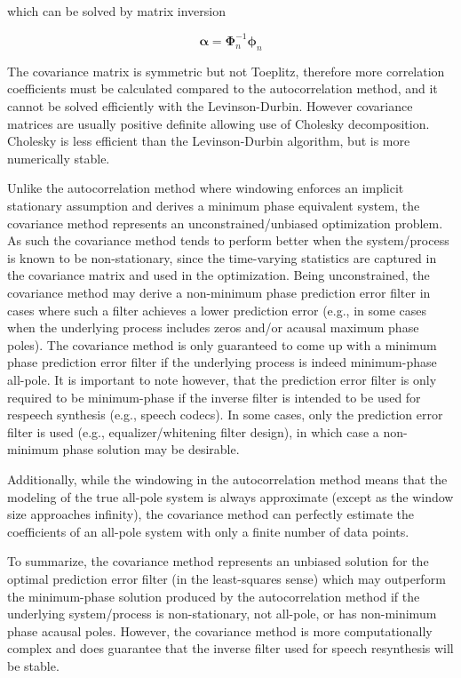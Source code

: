 \noindent
which can be solved by matrix inversion
 
 \begin{equation}
 	\boldsymbol{\alpha} = \boldsymbol{\Phi}_n^{-1} \boldsymbol{\phi}_n
 \end{equation}
 
The covariance matrix is symmetric but not Toeplitz, therefore more correlation coefficients must be calculated compared to the autocorrelation method, and it cannot be solved efficiently with the Levinson-Durbin. However covariance matrices are usually positive definite allowing use of Cholesky decomposition. Cholesky is less efficient than the Levinson-Durbin algorithm, but is more numerically stable.

Unlike the autocorrelation method where windowing enforces an implicit stationary assumption and derives a minimum phase equivalent system, the covariance method represents an unconstrained/unbiased optimization problem. As such the covariance method tends to perform better when the system/process is known to be non-stationary, since the time-varying statistics are captured in the covariance matrix and used in the optimization. Being unconstrained, the covariance method may derive a non-minimum phase prediction error filter in cases where such a filter achieves a lower prediction error (e.g., in some cases when the underlying process includes zeros and/or acausal maximum phase poles). The covariance method is only guaranteed to come up with a minimum phase prediction error filter if the underlying process is indeed minimum-phase all-pole. It is important to note however, that the prediction error filter is only required to be minimum-phase if the inverse filter is intended to be used for respeech synthesis (e.g., speech codecs). In some cases, only the prediction error filter is used (e.g., equalizer/whitening filter design), in which case a non-minimum phase solution may be desirable.

Additionally, while the windowing in the autocorrelation method means that the modeling of the true all-pole system is always approximate (except as the window size approaches infinity), the covariance method can perfectly estimate the coefficients of an all-pole system with only a finite number of data points.

To summarize, the covariance method represents an unbiased solution for the optimal prediction error filter (in the least-squares sense) which may outperform the minimum-phase solution produced by the autocorrelation method if the underlying system/process is non-stationary, not all-pole, or has non-minimum phase acausal poles. However, the covariance method is more computationally complex and does guarantee that the inverse filter used for speech resynthesis will be stable.

